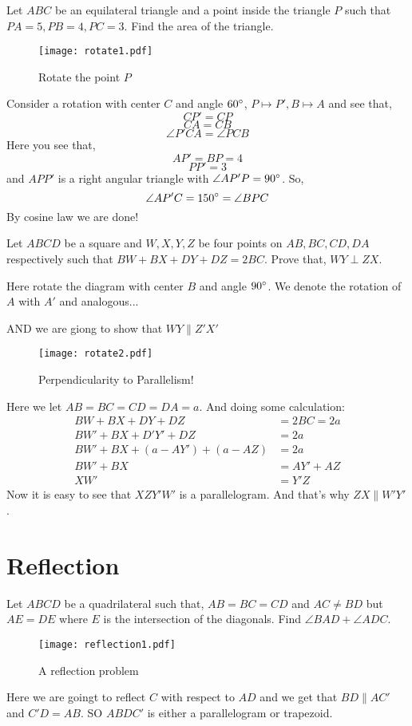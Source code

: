 \begin{example}
Let $ABC$ be an equilateral triangle and a point inside the triangle $P$ such that $PA=5, PB=4, PC=3$. Find the area of the triangle.
\end{example}
\begin{figure}[ht]
\centering
		\texttt{[image: rotate1.pdf]}
	\caption{Rotate the point $P$}
\end{figure}
Consider a rotation with center $C$ and angle $60^\circ$, $P\mapsto P', B\mapsto A$ and see that, \[CP'=CP\]
\[CA=CB\]
\[\angle P'CA = \angle PCB\]
Here you see that, \[AP'=BP=4\]
\[PP'=3\]
and $APP'$ is a right angular triangle with $\angle AP'P=90^\circ$.
So, \[ \angle AP'C=150^\circ=\angle BPC \]
By cosine law we are done!


\begin{example}
Let $ABCD$ be a square and $W,X,Y,Z$ be four points on $AB,BC,CD,DA$ respectively such that $BW+BX+DY+DZ=2BC$. Prove that, $WY\perp ZX$. 
\end{example}
Here rotate the diagram with center $B$ and
 angle $90^\circ$. We denote the rotation of $A$
  with $A'$ and analogous...


AND we are giong to show that $WY \parallel Z'X'$
\begin{figure}[ht]
\centering
		\texttt{[image: rotate2.pdf]}
	\caption{Perpendicularity to Parallelism!}
\end{figure}
Here we let $AB=BC=CD=DA=a$.
And doing some calculation:
\begin{align*}
BW+BX+DY+DZ &=2BC=2a\\
BW'+BX+D'Y'+DZ &=2a\\
BW'+BX+(a-AY')+(a-AZ) &=2a\\
BW'+BX &= AY'+AZ\\
XW'&=Y'Z
\end{align*}
Now it is easy to see that $XZY'W'$ is a parallelogram. And that's why $ZX\parallel W'Y'$.
\section{Reflection}

\begin{example}
Let $ABCD$ be a quadrilateral such that, $AB=BC=CD$ and $AC \neq BD$ but $AE=DE$ where $E$ is the intersection of the diagonals. Find $\angle BAD + \angle ADC$.
\end{example}

\begin{figure}
\centering
	\texttt{[image: reflection1.pdf]}
 	\caption{A reflection problem}
 \end{figure}
Here we are goingt to reflect $C$ with respect to $AD$ and we get that $BD\parallel AC'$ and $C'D=AB$. SO $ABDC'$ is either a parallelogram or trapezoid. 

